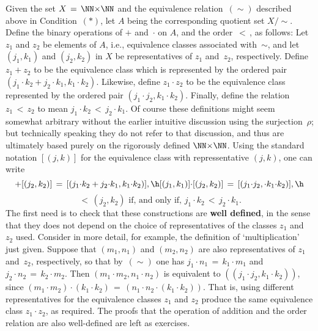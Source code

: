 {        Given the set $X \,=\, {\NN}{\times}{\NN}$ and the equivalence relation~$(\sim)$ described above in Condition~$({\ast})$,
    let $A$ being the corresponding quotient set $X/\sim$. Define the binary operations of $+$ and~${\cdot}$ on $A$, and the order $\,<\,$, as follows:
    Let $z_{1}$ and $z_{2}$ be elements of $A$, i.e., equivalence classes associated with~${\sim}$,
    and let $(j_{1},k_{1})$ and $(j_{2},k_{2})$ in $X$ be representatives of $z_{1}$ and~$z_{2}$, respectively.
    Define $z_{1} + z_{2}$ to be the equivalence class which is represented by the ordered pair $(j_{1}{\cdot}k_{2} + j_{2}{\cdot}k_{1}, k_{1}{\cdot}k_{2})$.
    Likewise, define $z_{1}{\cdot}z_{2}$ to be the equivalence class represented by the ordered pair $(j_{1}{\cdot}j_{2}, k_{1}{\cdot}k_{2})$.
    Finally, define the relation $z_{1}\,<\,z_{2}$ to mean $j_{1}{\cdot}k_{2}\,<\,j_{2}{\cdot}k_{1}$.
    Of course these definitions might seem somewhat arbitrary without the earlier intuitive discussion using the surjection~${\rho}$;
    but technically speaking they do not refer to that discussion, and thus are ultimately based purely on the rigorously defined ${\NN}{\times}{\NN}$.
    Using the standard notation $[(j,k)]$ for the equivalence class with repressentative $(j,k)$,
    one can write 
        \begin{displaymath}
        [(j_{1},k_{1})] + [(j_{2},k_{2})] \,=\, [(j_{1}{\cdot}k_{2} + j_{2}{\cdot}k_{1}, k_{1}{\cdot}k_{2})], \h
        [(j_{1},k_{1})]{\cdot}[(j_{2},k_{2})] \,=\, [(j_{1}{\cdot}j_{2},{\cdot} k_{1}{\cdot}k_{2})], \h
        \end{displaymath}
        \begin{displaymath}
        [(j_{1},k_{1})] \,<\, {(j_{2},k_{2})} \mbox{ if, and only if, }
        j_{1}{\cdot}k_{2}\,<\,j_{2}{\cdot}k_{1}.
        \end{displaymath}
    The first need is to check that these constructions are {\bf well defined},
    in the sense that they does not depend on the choice of representatives of the classes $z_{1}$ and~$z_{2}$ used.
    Consider in more detail, for example, the definition of `multiplication' just given.
    Suppose that $(m_{1}, n_{1})$ and $(m_{2}, n_{2})$ are also representatives of $z_{1}$ and~$z_{2}$, respectively,
    so that by~$(\sim)$ one has $j_{1}{\cdot}n_{1} \,=\, k_{1}{\cdot}m_{1}$ and $j_{2}{\cdot}n_{2} \,=\, k_{2}{\cdot}m_{2}$.
    Then $(m_{1}{\cdot}m_{2},n_{1}{\cdot}n_{2})$ is equivalent to $((j_{1}{\cdot}j_{2}, k_{1}{\cdot}k_{2}))$,
    since $(m_{1}{\cdot}m_{2}){\cdot}(k_{1}{\cdot}k_{2}) \,=\, (n_{1}{\cdot}n_{2}{\cdot}(k_{1}{\cdot}k_{2}))$.
    That is, using different representatives for the equivalence classes $z_{1}$ and $z_{2}$ produce the same equivalence class $z_{1}{\cdot}z_{2}$, as required.
    The proofs that the operation of addition and the order relation are also well-defined are left as exercises.

}
